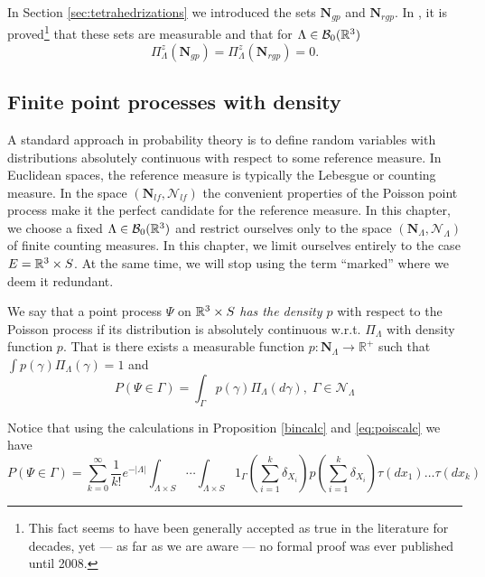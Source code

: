 \begin{remark}
	In Section \ref{sec:tetrahedrizations} we introduced the sets $\mathbf N_{gp}$ and $\mathbf N_{rgp}$. In \cite{Zessin2008}, it is proved\footnote{This fact seems to have been generally accepted as true in the literature for decades, yet --- as far as we are aware --- no formal proof was ever published until 2008.} that these sets are measurable and that for $\Lambda \in \mathcal B_0({\mathbb R^3})$
	$$\Pi^z_{\Lambda}(\mathbf N_{gp}) = \Pi^z_{\Lambda}(\mathbf N_{rgp})=0.$$
\end{remark}



\subsection{Finite point processes with density}\label{sec:densityPP}
A standard approach in probability theory is to define random variables with distributions absolutely continuous with respect to some reference measure. In Euclidean spaces, the reference measure is typically the Lebesgue or counting measure. In the space $(\mathbf N_{lf},\mathcal N_{lf})$ the convenient properties of the Poisson point process make it the perfect candidate for the reference measure. In this chapter, we choose a fixed $\Lambda \in \mathcal B_0({\mathbb R^3})$ and restrict ourselves only to the space $(\mathbf N_\Lambda,\mathcal N_\Lambda)$ of finite counting measures. 
In this chapter, we limit ourselves entirely to the case $E={\mathbb R^3} \times S$. At the same time, we will stop using the term ``marked'' where we deem it redundant. 

\begin{definition}
We say that a point process $\Psi$ on ${\mathbb R^3} \times S$ \textit{has the density $p$} with respect to the Poisson process if its distribution is absolutely continuous w.r.t. $\Pi_\Lambda$ with density function $p$. That is there exists a measurable function $p: \mathbf N_\Lambda \to \mathbb R^+$ such that $\int p(\gamma) \Pi_\Lambda (\gamma)=1$ and
$$P(\Psi \in \Gamma) = \int_\Gamma p(\gamma) \Pi_\Lambda(d\gamma), \; \Gamma \in \mathcal N_{\Lambda}$$
\end{definition}

Notice that using the calculations in Proposition \ref{bincalc} and \eqref{eq:poiscalc} we have
$$
P(\Psi \in \Gamma) = \sum^\infty_{k=0} \frac{1}{k!} e^{-|\Lambda|} \int_{\Lambda\times S} \cdots \int_{\Lambda\times S} 1_{\Gamma} \left(\sum^k_{i=1} \delta_{X_i}\right) p\left(\sum^k_{i=1} \delta_{X_i}\right) \tau(dx_1) \dots \tau(dx_k)
$$

